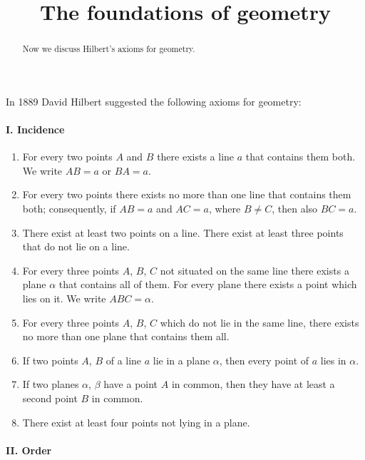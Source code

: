 \documentclass{ximera}
\title{The foundations of geometry}
\begin{document}
\begin{abstract}
Now we discuss Hilbert's axioms for geometry.
\end{abstract}
\maketitle

In 1889 David Hilbert suggested the following axioms for geometry:

\paragraph{I. Incidence}
\begin{enumerate}
\item For every two points $A$ and $B$ there exists a line $a$ that
  contains them both. We write $AB = a$ or $BA = a$.

\item For every two points there exists no more than one line that
  contains them both; consequently, if $AB = a$ and $AC = a$, where
  $B\ne C$, then also $BC = a$.

\item There exist at least two points on a line. There exist at least three
points that do not lie on a line.

\item For every three points $A$, $B$, $C$ not situated on the same
  line there exists a plane $\alpha$ that contains all of them. For
  every plane there exists a point which lies on it. We write $ABC =
  \alpha$.

\item For every three points $A$, $B$, $C$ which do not lie in the
  same line, there exists no more than one plane that contains them
  all.

\item If two points $A$, $B$ of a line $a$ lie in a plane $\alpha$,
  then every point of $a$ lies in $\alpha$.

\item If two planes $\alpha$, $\beta$ have a point $A$ in common, then
  they have at least a second point $B$ in common.

\item There exist at least four points not lying in a plane.
\end{enumerate}

\paragraph{II. Order}
\end{document}
